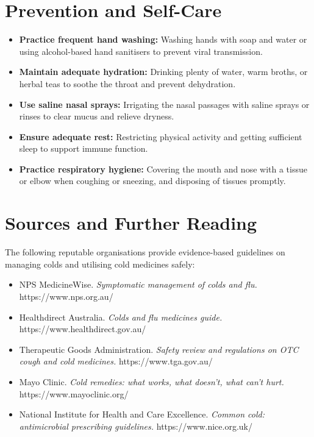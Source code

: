 \section*{Prevention and Self-Care}
\begin{itemize}
    \item \textbf{Practice frequent hand washing:} Washing hands with soap and water or using alcohol-based hand sanitisers to prevent viral transmission.
    \item \textbf{Maintain adequate hydration:} Drinking plenty of water, warm broths, or herbal teas to soothe the throat and prevent dehydration.
    \item \textbf{Use saline nasal sprays:} Irrigating the nasal passages with saline sprays or rinses to clear mucus and relieve dryness.
    \item \textbf{Ensure adequate rest:} Restricting physical activity and getting sufficient sleep to support immune function.
    \item \textbf{Practice respiratory hygiene:} Covering the mouth and nose with a tissue or elbow when coughing or sneezing, and disposing of tissues promptly.
\end{itemize}

\section*{Sources and Further Reading}
The following reputable organisations provide evidence-based guidelines on managing colds and utilising cold medicines safely:
\begin{itemize}
    \item NPS MedicineWise. \textit{Symptomatic management of colds and flu.} https://www.nps.org.au/
    \item Healthdirect Australia. \textit{Colds and flu medicines guide.} https://www.healthdirect.gov.au/
    \item Therapeutic Goods Administration. \textit{Safety review and regulations on OTC cough and cold medicines.} https://www.tga.gov.au/
    \item Mayo Clinic. \textit{Cold remedies: what works, what doesn't, what can't hurt.} https://www.mayoclinic.org/
    \item National Institute for Health and Care Excellence. \textit{Common cold: antimicrobial prescribing guidelines.} https://www.nice.org.uk/
\end{itemize}
